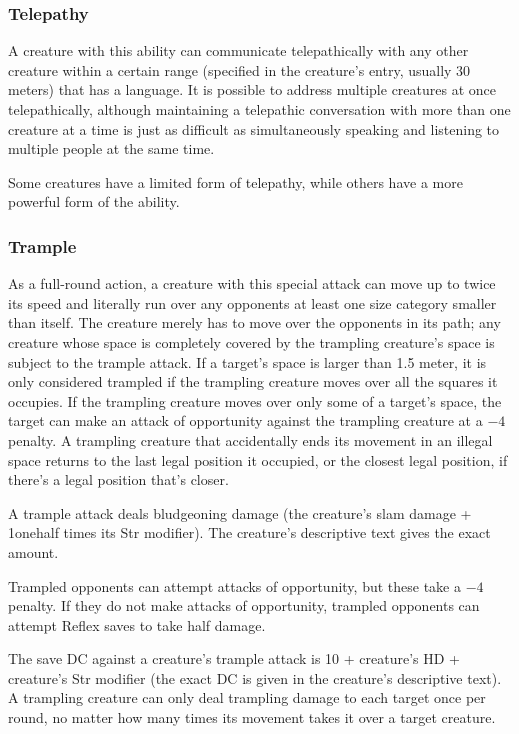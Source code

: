 \subsubsection{Telepathy}
A creature with this ability can communicate telepathically with any other creature within a certain range (specified in the creature's entry, usually 30 meters) that has a language. It is possible to address multiple creatures at once telepathically, although maintaining a telepathic conversation with more than one creature at a time is just as difficult as simultaneously speaking and listening to multiple people at the same time.

Some creatures have a limited form of telepathy, while others have a more powerful form of the ability.

\subsubsection{Trample}
As a full-round action, a creature with this special attack can move up to twice its speed and literally run over any opponents at least one size category smaller than itself. The creature merely has to move over the opponents in its path; any creature whose space is completely covered by the trampling creature's space is subject to the trample attack. If a target's space is larger than 1.5 meter, it is only considered trampled if the trampling creature moves over all the squares it occupies. If the trampling creature moves over only some of a target's space, the target can make an attack of opportunity against the trampling creature at a $-4$ penalty. A trampling creature that accidentally ends its movement in an illegal space returns to the last legal position it occupied, or the closest legal position, if there's a legal position that's closer.

A trample attack deals bludgeoning damage (the creature's slam damage + 1onehalf times its Str modifier). The creature's descriptive text gives the exact amount.

Trampled opponents can attempt attacks of opportunity, but these take a $-4$ penalty. If they do not make attacks of opportunity, trampled opponents can attempt Reflex saves to take half damage.

The save DC against a creature's trample attack is 10 + \onehalf creature's HD + creature's Str modifier (the exact DC is given in the creature's descriptive text). A trampling creature can only deal trampling damage to each target once per round, no matter how many times its movement takes it over a target creature.


